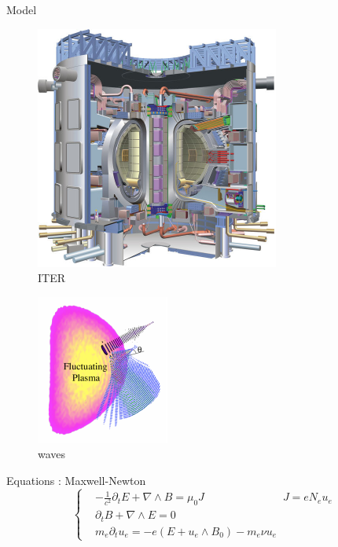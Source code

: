 \begin{frame}{Model}
 \begin{minipage}{0.45\linewidth}
 \begin{figure}
       		\includegraphics[scale = 0.7]{./images/ITER_cut}
       	\caption{ITER}
     	 \end{figure} 
\end{minipage}
\hfill
\begin{minipage}{0.45\linewidth}
 \begin{figure}
       		\includegraphics[scale = 1.2]{./images/antenne}
       		\caption{waves}
     	 \end{figure} 
\end{minipage}
\begin{block}{Equations : Maxwell-Newton}
\[
\begin{cases}
&-\frac{1}{c^2}\partial_t E + \nabla \wedge B = \mu_0 J \hspace{3cm} J = e N_e u_e\\
&\partial_t B + \nabla \wedge E  = 0	\\
&m_e \partial_t u_e  =  -e(E + u_e \wedge B_0 ) - m_e \nu u_e
\end{cases}
\]
\end{block}


\end{frame}
